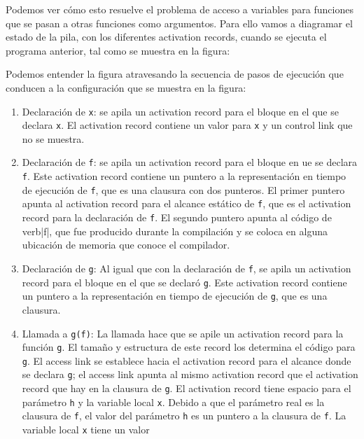 \documentclass[10pt,a4paper]{report}
\begin{document}
Podemos ver cómo esto resuelve el problema de acceso a variables para
funciones que se pasan a otras funciones como argumentos. Para ello
vamos a diagramar el estado de la pila, con los diferentes activation
records, cuando se ejecuta el programa anterior, tal como se muestra
en la figura:

\begin{figure}

\end{figure}

Podemos entender la figura atravesando la
secuencia de pasos de ejecución que conducen a la configuración que se
muestra en la figura:

\begin{enumerate}
\item Declaración de \verb|x|: se apila un activation record para el
  bloque en el que se declara \verb|x|. El activation record contiene
  un valor para \verb|x| y un control link que no se muestra.
\item Declaración de \verb|f|: se apila un activation record para el
  bloque en ue se declara \verb|f|. Este activation record contiene un
  puntero a la representación en tiempo de ejecución de \verb|f|, que
  es una clausura con dos punteros. El primer puntero apunta al
  activation record para el alcance estático de \verb|f|, que es el
  activation record para la declaración de \verb|f|. El segundo
  puntero apunta al código de verb|f|, que fue producido durante la
  compilación y se coloca en alguna ubicación de memoria que conoce el
  compilador.
\item Declaración de \verb|g|: Al igual que con la declaración de
  \verb|f|, se apila un activation record para el bloque en el que se
  declaró \verb|g|. Este activation record contiene un puntero a la
  representación en tiempo de ejecución de \verb|g|, que es una
  clausura.
\item Llamada a \verb|g(f)|: La llamada hace que se apile un
  activation record para la función \verb|g|. El tamaño y estructura
  de este record los determina el código para \verb|g|. El access link
  se establece hacia el activation record para el alcance donde se
  declara \verb|g|; el access link apunta al mismo activation record
  que el activation record que hay en la clausura de \verb|g|. El
  activation record tiene espacio para el parámetro \verb|h| y la
  variable local \verb|x|. Debido a que el parámetro real es la
  clausura de \verb|f|, el valor del parámetro \verb|h| es un puntero
  a la clausura de \verb|f|. La variable local \verb|x| tiene un valor

\end{enumerate}
\end{document}
